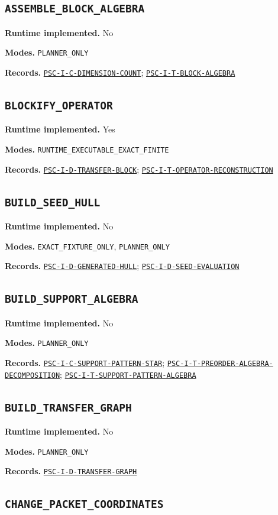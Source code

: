 \documentclass[a4paper,11pt]{article}
\newcommand{\field}[2]{\par\smallskip\noindent\textbf{#1.} #2\par}
\begin{document}
\subsection*{\nolinkurl{ASSEMBLE_BLOCK_ALGEBRA}}
\field{Runtime implemented}{No}
\field{Modes}{\nolinkurl{PLANNER_ONLY}}
\field{Records}{\hyperref[rec:PSC-I-C-DIMENSION-COUNT]{\nolinkurl{PSC-I-C-DIMENSION-COUNT}}; \hyperref[rec:PSC-I-T-BLOCK-ALGEBRA]{\nolinkurl{PSC-I-T-BLOCK-ALGEBRA}}}
\subsection*{\nolinkurl{BLOCKIFY_OPERATOR}}
\field{Runtime implemented}{Yes}
\field{Modes}{\nolinkurl{RUNTIME_EXECUTABLE_EXACT_FINITE}}
\field{Records}{\hyperref[rec:PSC-I-D-TRANSFER-BLOCK]{\nolinkurl{PSC-I-D-TRANSFER-BLOCK}}; \hyperref[rec:PSC-I-T-OPERATOR-RECONSTRUCTION]{\nolinkurl{PSC-I-T-OPERATOR-RECONSTRUCTION}}}
\subsection*{\nolinkurl{BUILD_SEED_HULL}}
\field{Runtime implemented}{No}
\field{Modes}{\nolinkurl{EXACT_FIXTURE_ONLY}, \nolinkurl{PLANNER_ONLY}}
\field{Records}{\hyperref[rec:PSC-I-D-GENERATED-HULL]{\nolinkurl{PSC-I-D-GENERATED-HULL}}; \hyperref[rec:PSC-I-D-SEED-EVALUATION]{\nolinkurl{PSC-I-D-SEED-EVALUATION}}}
\subsection*{\nolinkurl{BUILD_SUPPORT_ALGEBRA}}
\field{Runtime implemented}{No}
\field{Modes}{\nolinkurl{PLANNER_ONLY}}
\field{Records}{\hyperref[rec:PSC-I-C-SUPPORT-PATTERN-STAR]{\nolinkurl{PSC-I-C-SUPPORT-PATTERN-STAR}}; \hyperref[rec:PSC-I-T-PREORDER-ALGEBRA-DECOMPOSITION]{\nolinkurl{PSC-I-T-PREORDER-ALGEBRA-DECOMPOSITION}}; \hyperref[rec:PSC-I-T-SUPPORT-PATTERN-ALGEBRA]{\nolinkurl{PSC-I-T-SUPPORT-PATTERN-ALGEBRA}}}
\subsection*{\nolinkurl{BUILD_TRANSFER_GRAPH}}
\field{Runtime implemented}{No}
\field{Modes}{\nolinkurl{PLANNER_ONLY}}
\field{Records}{\hyperref[rec:PSC-I-D-TRANSFER-GRAPH]{\nolinkurl{PSC-I-D-TRANSFER-GRAPH}}}
\subsection*{\nolinkurl{CHANGE_PACKET_COORDINATES}}
\end{document}
